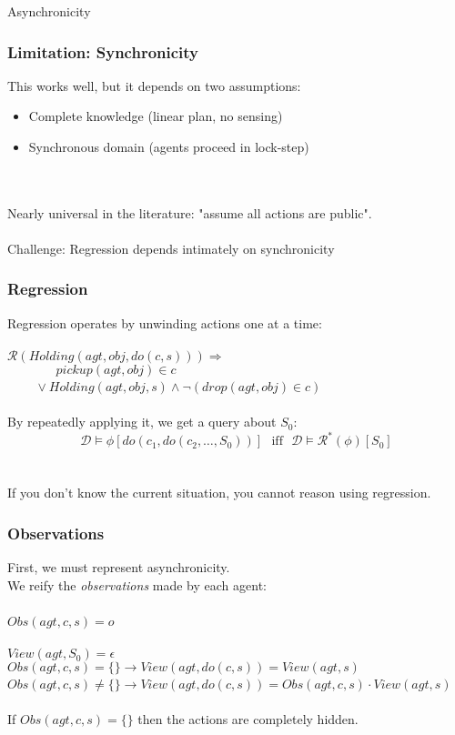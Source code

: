 \documentclass{beamer}
\newcommand{\Dt}{\mathcal{D}}
\newcommand{\Reg}{\mathcal{R}}
\begin{document}
\begin{frame}
\centering \large Asynchronicity\\
\end{frame}


\begin{frame}
\frametitle{Limitation: Synchronicity}
This works well, but it depends on two assumptions:
\begin{itemize}
\item Complete knowledge (linear plan, no sensing)
\item Synchronous domain (agents proceed in lock-step)
\end{itemize}
\pause
\ \\
\ \\
Nearly universal in the literature: "assume all actions are public".
\ \\
\ \\
\alert{Challenge:}  Regression depends intimately on synchronicity

\end{frame}

\begin{frame}
\frametitle{Regression}
Regression operates by unwinding actions one at a time:
\ \\
\ \\
$\Reg(Holding(agt,obj,do(c,s))) \Rightarrow$\\
$\,\,\,\,\,\,\,\,\,\,\,\,\,\,\,\,\,\,\,\,\,\,\,pickup(agt,obj) \in c$ \\
$\,\,\,\,\,\,\,\,\,\,\,\,\,\vee Holding(agt,obj,s) \wedge \neg\left(drop(agt,obj) \in c\right)$
\ \\
\ \\
\pause
By repeatedly applying it, we get a query about $S_0$:
\[
\Dt\models\phi[do(c_1,do(c_2,\dots,S_0))]\,\,\,\,\mathrm{iff}\,\,\,\,\Dt\models\Reg^{*}(\phi)[S_0]
\]
\ \\
\ \\
If you don't know the current situation, you cannot reason using regression.
\end{frame}

\begin{frame}
\frametitle{Observations}
First, we must represent asynchronicity.\\
We reify the \emph{observations} made by each agent:
\ \\
\ \\
\small
$Obs(agt,c,s) = o$
\ \\
\ \\
\pause
$View(agt,S_0) = \epsilon$\\
$Obs(agt,c,s) = \{\} \rightarrow View(agt,do(c,s)) = View(agt,s)$\\
$Obs(agt,c,s) \neq \{\} \rightarrow View(agt,do(c,s)) = Obs(agt,c,s) \cdot View(agt,s)$
\normalsize
\ \\
\ \\
\pause
If $Obs(agt,c,s)=\{\}$ then the actions are completely hidden.
\end{frame}
\end{document}
